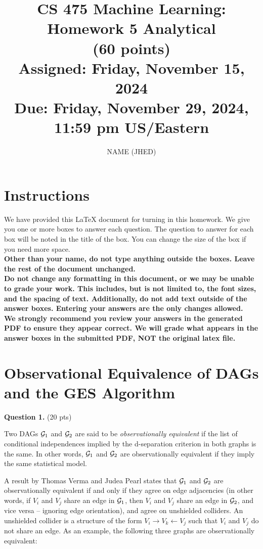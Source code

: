 \documentclass[11pt]{article}
\title{CS 475 Machine Learning: Homework 5 Analytical \\
(60 points)\\
\Large{Assigned: Friday, November 15, 2024} \\
\Large{Due: Friday, November 29, 2024, 11:59 pm US/Eastern}}
\author{NAME (JHED)}
\date{}
\begin{document}
\maketitle
\thispagestyle{headings}

\section*{Instructions }
We have provided this \LaTeX{} document for turning in this homework. We give you one or more boxes to answer each question.  The question to answer for each box will be noted in the title of the box.  You can change the size of the box if you need more space.\\

{\bf Other than your name, do not type anything outside the boxes. Leave the rest of the document unchanged.}\\


\textbf{Do not change any formatting in this document, or we may be unable to
  grade your work. This includes, but is not limited to, the font sizes, and the spacing of text.  Additionally, do
  not add text outside of the answer boxes. Entering your answers are the only
  changes allowed.}\\


\textbf{We strongly recommend you review your answers in the generated PDF to
  ensure they appear correct. We will grade what appears in the answer boxes in
  the submitted PDF, NOT the original latex file.}

\pagebreak

\section*{Observational Equivalence of DAGs and the GES Algorithm}

{\bf Question 1.} (20 pts)

Two DAGs ${\cal G}_1$ and ${\cal G}_2$ are said to be \emph{observationally equivalent} if the list of conditional independences implied by the d-separation criterion in both graphs is the same.  In other words, ${\cal G}_1$ and ${\cal G}_2$ are observationally equivalent if they imply the same statistical model.

A result by Thomas Verma and Judea Pearl states that ${\cal G}_1$ and ${\cal G}_2$ are observationally equivalent if and only if they agree on edge adjacencies (in other words, if $V_i$ and $V_j$ share an edge in ${\cal G}_1$, then $V_i$ and $V_j$ share an edge in ${\cal G}_2$, and vice versa -- ignoring edge orientation), and agree on unshielded colliders.  An unshielded collider is a structure of the form $V_i \to V_k \gets V_j$ such that $V_i$ and $V_j$ do not share an edge.  As an example, the following three graphs are observationally equivalent:
\end{document}
